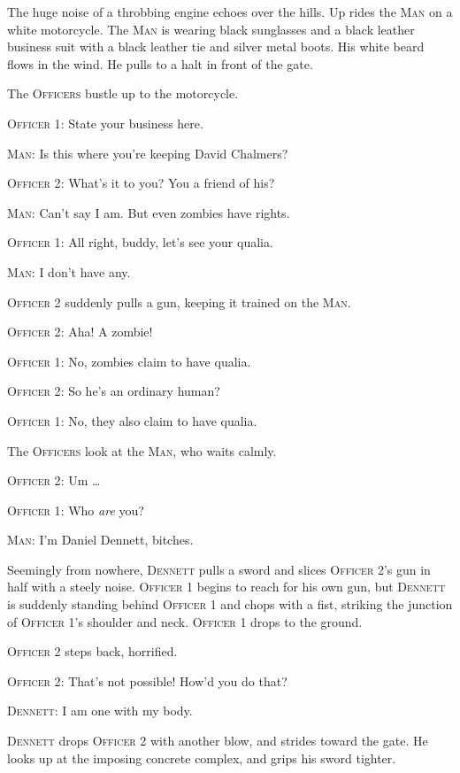 {
 The huge noise of a throbbing engine echoes over the hills. Up
rides the \textsc{Man} on a white motorcycle. The \textsc{Man} is wearing black
sunglasses and a black leather business suit with a black leather tie
and silver metal boots. His white beard flows in the wind. He pulls to
a halt in front of the gate.}

{
 The \textsc{Officers} bustle up to the motorcycle.}

{
 \textsc{Officer 1}: State your business here.}

{
 \textsc{Man}: Is this where you're keeping David Chalmers?}

{
 \textsc{Officer 2}: What's it to you? You a friend of his?}

{
 \textsc{Man}: Can't say I am. But even zombies have
rights.}

{
 \textsc{Officer 1}: All right, buddy, let's see your
qualia.}

{
 \textsc{Man}: I don't have any.}

{
 \textsc{Officer 2} suddenly pulls a gun, keeping it trained on the \textsc{Man}.}

{
 \textsc{Officer 2}: Aha! A zombie!}

{
 \textsc{Officer 1}: No, zombies claim to have qualia.}

{
 \textsc{Officer 2}: So he's an ordinary human?}

{
 \textsc{Officer 1}: No, they also claim to have qualia.}

{
 The \textsc{Officers} look at the \textsc{Man}, who waits calmly.}

{
 \textsc{Officer 2}: Um \ldots}

{
 \textsc{Officer 1}: Who \textit{are} you?}

{
 \textsc{Man}: I'm Daniel Dennett, bitches.}

{
 Seemingly from nowhere, \textsc{Dennett} pulls a sword and slices \textsc{Officer
2}'s gun in half with a steely noise. \textsc{Officer 1} begins
to reach for his own gun, but \textsc{Dennett} is suddenly standing behind
\textsc{Officer 1} and chops with a fist, striking the junction of \textsc{Officer
1}'s shoulder and neck. \textsc{Officer 1} drops to the ground.}

{
 \textsc{Officer 2} steps back, horrified.}

{
 \textsc{Officer 2}: That's not possible!
How'd you do that?}

{
 \textsc{Dennett}: I am one with my body.}

{
 \textsc{Dennett} drops \textsc{Officer 2} with another blow, and strides toward the
gate. He looks up at the imposing concrete complex, and grips his sword
tighter.}

